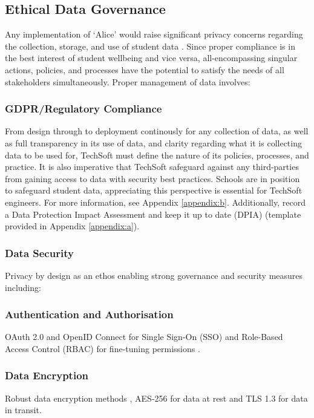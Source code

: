 \documentclass[14pt,a4paper]{article}
\begin{document}
\begin{multicols}{2}
\subsection{Ethical Data Governance}
Any implementation of `Alice' would raise significant privacy concerns regarding the collection, storage, and use of student data \textit{\parencite[pp. 366-370]{Annus2023}}.
Since proper compliance is in the best interest of student wellbeing and vice versa, all-encompassing singular actions, policies, and processes have the potential to satisfy the needs of all stakeholders simultaneously. Proper management of data involves:

\subsubsection{GDPR/Regulatory Compliance}
From design through to deployment continously for any collection of data, as well as full transparency in its use of data, and clarity regarding what it is collecting data to be used for, TechSoft must define the nature of its policies, processes, and practice. It is also imperative that TechSoft safeguard against any third-parties from gaining access to data with security best practices. Schools are in position to safeguard student data, appreciating this perspective is essential for TechSoft engineers. For more information, see Appendix \ref{appendix:b}. Additionally, record a Data Protection Impact Assessment and keep it up to date (DPIA) (template provided in Appendix \ref{appendix:a}).

\subsubsection{Data Security}
Privacy by design as an ethos enabling strong governance and security measures including:

\subsubsection*{Authentication and Authorisation}
OAuth 2.0 and OpenID Connect for Single Sign-On (SSO) and Role-Based Access Control (RBAC) for fine-tuning permissions \textit{\parencite[pp. 80-120]{Josuttis2023}}.

\subsubsection*{Data Encryption}
Robust data encryption methods \textit{\parencite[pp. 100-150]{Stallings2023}}, AES-256 for data at rest and TLS 1.3 for data in transit.


\end{multicols}
\end{document}
